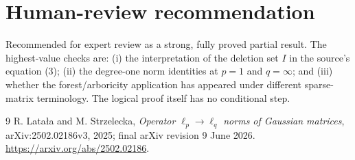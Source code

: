 \documentclass[11pt]{article}
\theoremstyle{definition}
\theoremstyle{remark}
\begin{document}
\section{Human-review recommendation}

Recommended for expert review as a strong, fully proved partial result.  The
highest-value checks are: (i) the interpretation of the deletion set $I$ in
the source's equation (3); (ii) the degree-one norm identities at $p=1$ and
$q=\infty$; and (iii) whether the forest/arboricity application has appeared
under different sparse-matrix terminology.  The logical proof itself has no
conditional step.

\begin{thebibliography}{9}
R. Lata\l a and M. Strzelecka,
\emph{Operator $\ell_p\to\ell_q$ norms of Gaussian matrices},
arXiv:2502.02186v3, 2025; final arXiv revision 9 June 2026.
\url{https://arxiv.org/abs/2502.02186}.
\end{thebibliography}
\end{document}
